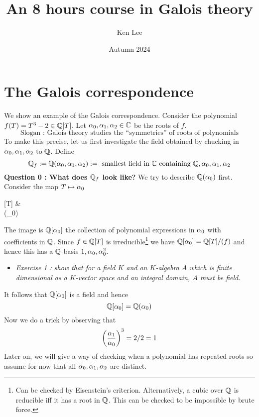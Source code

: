 \documentclass{article}
\begin{document}
\title{An 8 hours course in Galois theory}

\author{Ken Lee}
\date{Autumn 2024}
\maketitle

\tableofcontents

\section{The Galois correspondence}

We show an example of the Galois correspondence.
Consider the polynomial $f(T) = T^3 - 2 \in \mathbb{Q}[T]$.
Let $\alpha_0 , \alpha_1 , \alpha_2 \in \mathbb{C}$ be the roots of $f$.
\[
  \text{Slogan : Galois theory studies the ``symmetries'' of 
  roots of polynomials}
\]
To make this precise, let us first investigate the field obtained
by chucking in $\alpha_0 , \alpha_1 , \alpha_2$ to $\mathbb{Q}$.
Define \[
  \mathbb{Q}_f := \mathbb{Q}(\alpha_0 , \alpha_1 , \alpha_2) := 
  \text{ smallest field in $\mathbb{C}$ containing $\mathbb{Q} , \alpha_0 , \alpha_1 ,\alpha_2$}
\]
\textbf{Question 0 : What does $\mathbb{Q}_f$ look like?}
We try to describe $\mathbb{Q}(\alpha_0)$ first.
Consider the map $T \mapsto \alpha_0$ 
\begin{cd}
	{} & {} \\
	{(\alpha_0)}
	\arrow["{T \mapsto \al_0}", from=1-1, to=1-2]
	\arrow[dashed, from=1-1, to=2-1]
	\arrow["\subseteq"', from=2-1, to=1-2]
\end{cd}
The image is $\mathbb{Q}[\alpha_0]$ the collection of polynomial expressions
in $\alpha_0$ with coefficients in $\mathbb{Q}$.
Since $f \in \mathbb{Q}[T]$ is irreducible\footnote{
  Can be checked by Eisenstein's criterion.
  Alternatively, a cubic over $\mathbb{Q}$ is reducible iff
  it has a root in $\mathbb{Q}$.
  This can be checked to be impossible by brute force.
}
we have $\mathbb{Q}[\alpha_0] = \mathbb{Q}[T] / (f)$
and hence this has a $\mathbb{Q}$-basis $1 , \alpha_0 , \alpha_0^2$.
\begin{itemize}
  \item \textit{
    Exercise 1 :  show that for a field $K$ and 
    an $K$-algebra $A$ which is finite dimensional 
    as a $K$-vector space and an integral domain,
    $A$ must be field.
  }
\end{itemize}
It follows that $\mathbb{Q}[\alpha_0]$ is a field and hence
\[
  \mathbb{Q}[\alpha_0] = \mathbb{Q}(\alpha_0)
\]
Now we do a trick by observing that \[
  \left(\frac{\alpha_1}{\alpha_0}\right)^3 = 2 / 2 = 1
\]
Later on, we will give a way of checking when a polynomial has repeated roots
so assume for now that all $\alpha_0 , \alpha_1 , \alpha_2$ are distinct.
\end{document}
